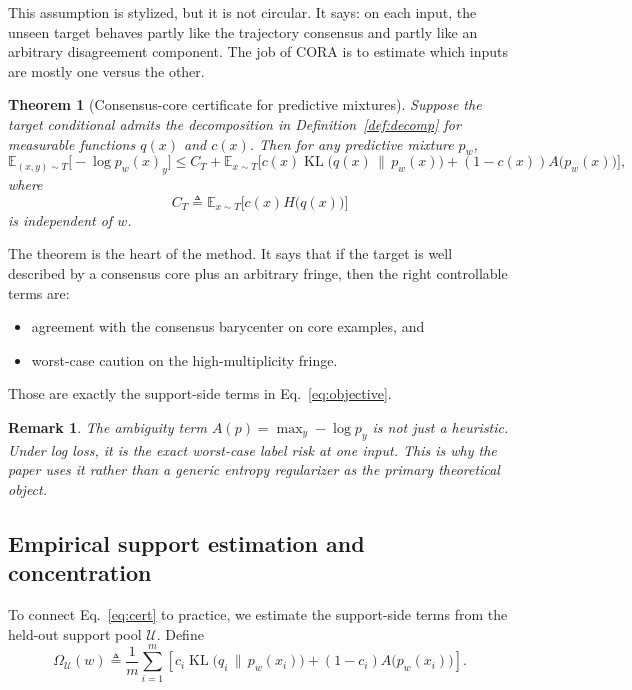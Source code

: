 \documentclass{article}
\newtheorem{theorem}{Theorem}
\newtheorem{remark}{Remark}
\newcommand{\EE}{\mathbb{E}}
\newcommand{\cU}{\mathcal{U}}
\newcommand{\KL}{\operatorname{KL}}
\newcommand{\cora}{\textup{\textsc{CORA}}}
\begin{document}
This assumption is stylized, but it is not circular. It says: on each input, the unseen target behaves partly like the trajectory consensus and partly like an arbitrary disagreement component. The job of \cora{} is to estimate which inputs are mostly one versus the other.

\begin{theorem}[Consensus-core certificate for predictive mixtures]
\label{thm:certificate}
Suppose the target conditional admits the decomposition in Definition~\ref{def:decomp} for measurable functions $q(x)$ and $c(x)$. Then for any predictive mixture $p_w$,
\begin{equation}
    \EE_{(x,y)\sim T}\big[-\log p_w(x)_y\big]
    \le
    C_T
    +
    \EE_{x\sim T}
    \Big[
        c(x)\KL\!\big(q(x)\,\|\,p_w(x)\big)
        +
        (1-c(x))A\!\big(p_w(x)\big)
    \Big],
    \label{eq:cert}
\end{equation}
where
\[
    C_T
    \triangleq
    \EE_{x\sim T}
    \Big[
        c(x)H\!\big(q(x)\big)
    \Big]
\]
is independent of $w$.
\end{theorem}

The theorem is the heart of the method. It says that if the target is well described by a consensus core plus an arbitrary fringe, then the right controllable terms are:
\begin{itemize}[leftmargin=1.4em]
    \item agreement with the consensus barycenter on core examples, and
    \item worst-case caution on the high-multiplicity fringe.
\end{itemize}
Those are exactly the support-side terms in Eq.~\eqref{eq:objective}.

\begin{remark}
The ambiguity term $A(p)=\max_y -\log p_y$ is not just a heuristic. Under log loss, it is the exact worst-case label risk at one input. This is why the paper uses it rather than a generic entropy regularizer as the primary theoretical object.
\end{remark}

\subsection{Empirical support estimation and concentration}

To connect Eq.~\eqref{eq:cert} to practice, we estimate the support-side terms from the held-out support pool $\cU$. Define
\begin{equation}
    \Omega_{\cU}(w)
    \triangleq
    \frac{1}{m}
    \sum_{i=1}^{m}
    \left[
        c_i \KL\!\big(q_i\,\|\,p_w(x_i)\big)
        +
        (1-c_i)A\!\big(p_w(x_i)\big)
    \right].
    \label{eq:omegaU}
\end{equation}
\end{document}
